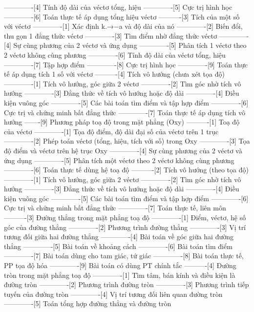 -------------[4] Tính độ dài của véctơ tổng, hiệu
-------------[5] Cực trị hình học
-------------[6] Toán thực tế áp dụng tổng hiệu véctơ
----------[3] Tích của một số với véctơ
-------------[1] Xác định k.→−a và độ dài của nó
-------------[2] Biến đổi, thu gọn 1 đẳng thức véctơ
-------------[3] Tìm điểm nhờ đẳng thức véctơ
-------------[4] Sự cùng phương của 2 véctơ và ứng dụng
-------------[5] Phân tích 1 véctơ theo 2 véctơ không cùng phương
-------------[6] Tính độ dài của véctơ tổng, hiệu
-------------[7] Tập hợp điểm
-------------[8] Cực trị hình học
-------------[9] Toán thực tế áp dụng tích 1 số với véctơ
----------[4] Tích vô hướng (chưa xét tọa độ)
-------------[1] Tích vô hướng, góc giữa 2 véctơ
-------------[2] Tìm góc nhờ tích vô hướng
-------------[3] Đẳng thức về tích vô hướng hoặc độ dài
-------------[4] Điều kiện vuông góc
-------------[5] Các bài toán tìm điểm và tập hợp điểm
-------------[6] Cực trị và chứng minh bất đẳng thức
-------------[7] Toán thực tế áp dụng tích vô hướng
-------[9] Phương pháp toạ độ trong mặt phẳng (Oxy)
----------[1] Toạ độ của véctơ
-------------[1] Tọa độ điểm, độ dài đại số của véctơ trên 1 trục
-------------[2] Phép toán véctơ (tổng, hiệu, tích với số) trong Oxy
-------------[3] Tọa độ điểm và véctơ trên hệ trục Oxy
-------------[4] Sự cùng phương của 2 véctơ và ứng dụng
-------------[5] Phân tích một véctơ theo 2 véctơ không cùng phương
-------------[6] Toán thực tế dùng hệ toạ độ
----------[2] Tích vô hướng (theo tọa độ)
-------------[1] Tích vô hướng, góc giữa 2 véctơ
-------------[2] Tìm góc nhờ tích vô hướng
-------------[3] Đẳng thức về tích vô hướng hoặc độ dài
-------------[4] Điều kiện vuông góc
-------------[5] Các bài toán tìm điểm và tập hợp điểm
-------------[6] Cực trị và chứng minh bất đẳng thức
-------------[7] Toán thực tế, liên môn
----------[3] Đường thẳng trong mặt phẳng toạ độ
-------------[1] Điểm, véctơ, hệ số góc của đường thẳng
-------------[2] Phương trình đường thẳng
-------------[3] Vị trí tương đối giữa hai đường thẳng
-------------[4] Bài toán về góc giữa hai đường thẳng
-------------[5] Bài toán về khoảng cách
-------------[6] Bài toán tìm điểm
-------------[7] Bài toán dùng cho tam giác, tứ giác
-------------[8] Bài toán thực tế, PP tọa độ hóa
-------------[9] Bài toán có dùng PT chính tắc
----------[4] Đường tròn trong mặt phẳng toạ độ
-------------[1] Tìm tâm, bán kính và điều kiện là đường tròn
-------------[2] Phương trình đường tròn
-------------[3] Phương trình tiếp tuyến của đường tròn
-------------[4] Vị trí tương đối liên quan đường tròn
-------------[5] Toán tổng hợp đường thẳng và đường tròn
